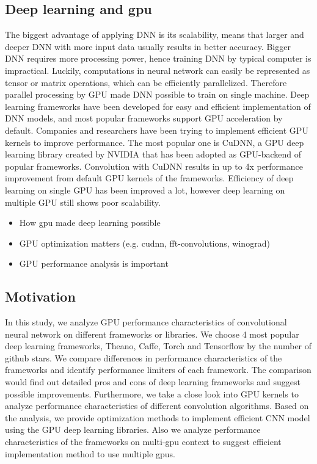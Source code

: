 \documentclass[conference]{IEEEtran}
\begin{document}
\subsection{Deep learning and gpu}
The biggest advantage of applying DNN is its scalability, means that larger and deeper DNN with more input data usually results in better accuracy.
Bigger DNN requires more processing power, hence training DNN by typical computer is impractical.
Luckily, computations in neural network can easily be represented as tensor or matrix operations, which can be efficiently parallelized.
Therefore parallel processing by GPU made DNN possible to train on single machine.
Deep learning frameworks have been developed for easy and efficient implementation of DNN models, and most popular frameworks support GPU acceleration by default.
\cite{} %
Companies and researchers have been trying to implement efficient GPU kernels to improve performance.
\cite{} %
The most popular one is CuDNN, a GPU deep learning library created by NVIDIA that has been adopted as GPU-backend of popular frameworks.
\cite{} %
Convolution with CuDNN results in up to 4x performance improvement from default GPU kernels of the frameworks.
\cite{} %
Efficiency of deep learning on single GPU has been improved a lot, however deep learning on multiple GPU still shows poor scalability.
\cite{} %

\begin{itemize}
\item How gpu made deep learning possible
\item GPU optimization matters (e.g. cudnn, fft-convolutions, winograd)
\item GPU performance analysis is important
\end{itemize}

\subsection{Motivation}
In this study, we analyze GPU performance characteristics of convolutional neural network on different frameworks or libraries.
We choose 4 most popular deep learning frameworks, Theano, Caffe, Torch and Tensorflow by the number of github stars.
We compare differences in performance characteristics of the frameworks and identify performance limiters of each framework.
The comparison would find out detailed pros and cons of deep learning frameworks and suggest possible improvements.
Furthermore, we take a close look into GPU kernels to analyze performance characteristics of different convolution algorithms.
Based on the analysis, we provide optimization methods to implement efficient CNN model using the GPU deep learning libraries.
Also we analyze performance characteristics of the frameworks on multi-gpu context to suggest efficient implementation method to use multiple gpus.
\end{document}
